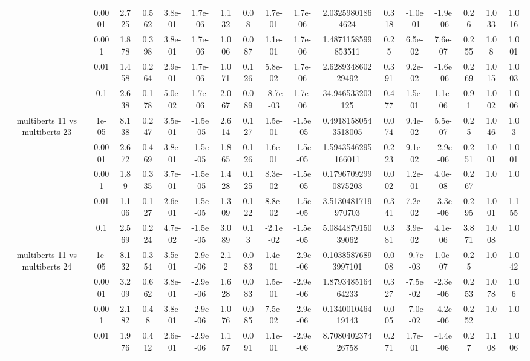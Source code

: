 \begin{tabular}{|c|c|c|c|c|c|c|c|c|c|c|c|c|c|c|c|c|}
 & 0.0001 & 2.725 & 0.562 & 3.8e-01 & 1.7e-06 & 1.132 & 0.08 & 1.7e-01 & 1.7e-06 & 2.03259801864624 & 0.318 & -1.0e-01 & -1.9e-06 & 0.26 & 1.033 & 1.016 \\
 & 0.001 & 1.878 & 0.398 & 3.8e-01 & 1.7e-06 & 1.006 & 0.087 & 1.1e-01 & 1.7e-06 & 1.4871158599853511 & 0.25 & 6.5e-02 & 7.6e-07 & 0.255 & 1.08 & 1.001 \\
 & 0.01 & 1.458 & 0.264 & 2.9e-01 & 1.7e-06 & 1.071 & 0.126 & 5.8e-02 & 1.7e-06 & 2.628934860229492 & 0.391 & 9.2e-02 & -1.6e-06 & 0.269 & 1.015 & 1.003 \\
 & 0.1 & 2.638 & 0.178 & 5.0e-02 & 1.7e-06 & 2.067 & 0.089 & -8.7e-03 & 1.7e-06 & 34.946533203125 & 0.477 & 1.5e-01 & 1.1e-06 & 0.91 & 1.002 & 1.006 \\
\hline
\multirow{5}{*}{multiberts 11 vs multiberts 23} & 1e-05 & 8.138 & 0.247 & 3.5e-01 & -1.5e-05 & 2.614 & 0.127 & 1.5e-01 & -1.5e-05 & 0.49181580543518005 & 0.074 & 9.4e-02 & 5.5e-07 & 0.25 & 1.046 & 1.03 \\
 & 0.0001 & 2.672 & 0.469 & 3.8e-01 & -1.5e-05 & 1.865 & 0.126 & 1.6e-01 & -1.5e-05 & 1.5943546295166011 & 0.223 & 9.1e-02 & -2.9e-06 & 0.251 & 1.001 & 1.001 \\
 & 0.001 & 1.89 & 0.335 & 3.7e-01 & -1.5e-05 & 1.428 & 0.125 & 8.3e-02 & -1.5e-05 & 0.17967092990875203 & 0.002 & 1.2e-01 & 4.0e-08 & 0.267 & 1.0 & 1.0 \\
 & 0.01 & 1.106 & 0.127 & 2.6e-01 & -1.5e-05 & 1.309 & 0.122 & 8.8e-02 & -1.5e-05 & 3.5130481719970703 & 0.341 & 7.2e-02 & -3.3e-06 & 0.295 & 1.001 & 1.155 \\
 & 0.1 & 2.569 & 0.224 & 4.7e-02 & -1.5e-05 & 3.089 & 0.13 & -2.1e-02 & -1.5e-05 & 5.084487915039062 & 0.381 & 3.9e-02 & 4.1e-06 & 3.871 & 1.008 & 1.0 \\
\hline
\multirow{5}{*}{multiberts 11 vs multiberts 24} & 1e-05 & 8.132 & 0.354 & 3.5e-01 & -2.9e-06 & 2.12 & 0.083 & 1.4e-01 & -2.9e-06 & 0.10385876893997101 & 0.008 & -9.7e-03 & 1.0e-07 & 0.25 & 1.0 & 1.042 \\
 & 0.0001 & 3.209 & 0.662 & 3.8e-01 & -2.9e-06 & 1.628 & 0.083 & 1.5e-01 & -2.9e-06 & 1.879348516464233 & 0.327 & -7.5e-02 & -2.3e-06 & 0.253 & 1.078 & 1.06 \\
 & 0.001 & 2.182 & 0.48 & 3.8e-01 & -2.9e-06 & 1.076 & 0.085 & 7.5e-02 & -2.9e-06 & 0.134001046419143 & 0.005 & -7.0e-02 & -4.2e-06 & 0.252 & 1.0 & 1.0 \\
 & 0.01 & 1.976 & 0.412 & 2.6e-01 & -2.9e-06 & 1.157 & 0.091 & 1.1e-01 & -2.9e-06 & 8.708040237426758 & 0.271 & 1.7e-01 & -4.4e-06 & 0.27 & 1.108 & 1.006 \\

\end{tabular}
